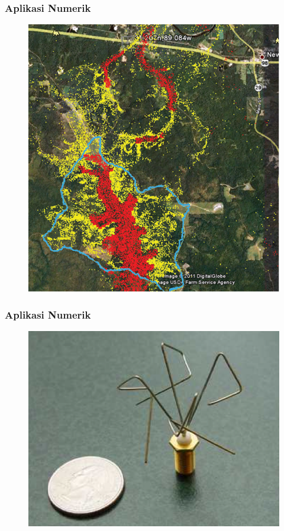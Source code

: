 \documentclass{beamer}
\begin{document}

\begin{frame}
\frametitle{Aplikasi Numerik}
\begin{figure}[htp]
\centering
\includegraphics[scale=0.40]{ditempel201.png}
\end{figure}
\end{frame}


\begin{frame}
\frametitle{Aplikasi Numerik}
\begin{figure}[htp]
\centering
\includegraphics[scale=0.30]{2v2aww6.png}
\end{figure}
\end{frame}
\end{document}
